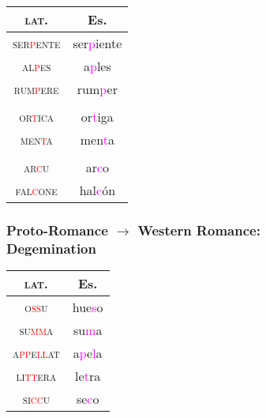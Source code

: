 \documentclass{beamer}
\begin{document}
\begin{frame}

	\begin{center}
		\begin{tabular}{c c}
			\textsc{lat.}                      & Es.                            \\
			\hline
			\textsc{ser\textcolor{red}{p}ente} & ser\textcolor{magenta}{p}iente \\
			\textsc{al\textcolor{red}{p}es}    & a\textcolor{magenta}{p}les     \\
			\textsc{rum\textcolor{red}{p}ere}  & rum\textcolor{magenta}{p}er    \\
			                                   &                                \\
			\textsc{or\textcolor{red}{t}ica}   & or\textcolor{magenta}{t}iga    \\
			\textsc{men\textcolor{red}{t}a}    & men\textcolor{magenta}{t}a     \\
			                                   &                                \\
			\textsc{ar\textcolor{red}{c}u}     & ar\textcolor{magenta}{c}o      \\
			\textsc{fal\textcolor{red}{c}one}  & hal\textcolor{magenta}{c}ón    \\
		\end{tabular}
	\end{center}

\end{frame}

\begin{frame}
	\frametitle{Proto-Romance $\rightarrow$ Western Romance: \\ Degemination}

	\begin{center}
		\begin{tabular}{c c}
			\textsc{lat.}                                       & Es.                                             \\
			\hline
			\textsc{o\textcolor{red}{ss}u}                      & hue\textcolor{magenta}{s}o                      \\
			\textsc{su\textcolor{red}{mm}a}                     & su\textcolor{magenta}{m}a                       \\
			\textsc{a\textcolor{red}{pp}e\textcolor{red}{ll}at} & a\textcolor{magenta}{p}e\textcolor{magenta}{l}a \\
			\textsc{li\textcolor{red}{tt}era}                   & le\textcolor{magenta}{t}ra                      \\
			\textsc{si\textcolor{red}{cc}u}                     & se\textcolor{magenta}{c}o                       \\
		\end{tabular}
	\end{center}

\end{frame}
\end{document}
